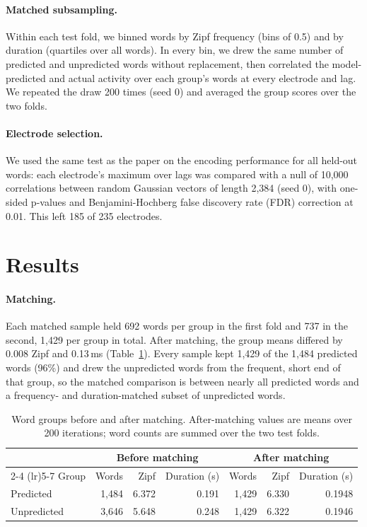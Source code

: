 \documentclass[11pt]{article}
\begin{document}
\paragraph{Matched subsampling.}
Within each test fold, we binned words by Zipf frequency (bins of 0.5) and by duration (quartiles over all words). In every bin, we drew the same number of predicted and unpredicted words without replacement, then correlated the model-predicted and actual activity over each group's words at every electrode and lag. We repeated the draw 200 times (seed 0) and averaged the group scores over the two folds.

\paragraph{Electrode selection.}
We used the same test as the paper on the encoding performance for all held-out words: each electrode's maximum over lags was compared with a null of 10,000 correlations between random Gaussian vectors of length 2,384 (seed 0), with one-sided p-values and Benjamini-Hochberg false discovery rate (FDR) correction at 0.01. This left 185 of 235 electrodes.

\section{Results}

\paragraph{Matching.}
Each matched sample held 692 words per group in the first fold and 737 in the second, 1,429 per group in total. After matching, the group means differed by 0.008 Zipf and 0.13\,ms (Table~\ref{tab:groups}). Every sample kept 1,429 of the 1,484 predicted words (96\%) and drew the unpredicted words from the frequent, short end of that group, so the matched comparison is between nearly all predicted words and a frequency- and duration-matched subset of unpredicted words.

\begin{table}[htbp]
\centering
\caption{Word groups before and after matching. After-matching values are means over 200 iterations; word counts are summed over the two test folds.}
\label{tab:groups}
\begin{tabular}{lrrrrrr}
\toprule
 & \multicolumn{3}{c}{Before matching} & \multicolumn{3}{c}{After matching} \\
\cmidrule(lr){2-4} \cmidrule(lr){5-7}
Group & Words & Zipf & Duration (s) & Words & Zipf & Duration (s) \\
\midrule
Predicted   & 1,484 & 6.372 & 0.191 & 1,429 & 6.330 & 0.1948 \\
Unpredicted & 3,646 & 5.648 & 0.248 & 1,429 & 6.322 & 0.1946 \\
\bottomrule
\end{tabular}
\end{table}
\end{document}
